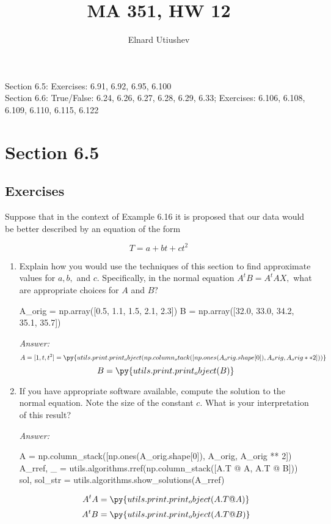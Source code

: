 \documentclass[letterpaper]{article}
\title{MA 351, HW 12}
\author{Elnard Utiushev}
\newcommand{\ans}{\textit{Answer: }}
\newenvironment{question}[2][Question]{\begin{trivlist}
\item[\hskip \labelsep {\bfseries #1}\hskip \labelsep {\bfseries #2.}]}{\end{trivlist}}
\newcommand{\printobj}[1]{\py{utils.print.print_object(#1)}}
\begin{document}
\maketitle

Section 6.5: Exercises: 6.91, 6.92, 6.95, 6.100 \\
Section 6.6: True/False: 6.24, 6.26, 6.27, 6.28, 6.29, 6.33; 
Exercises: 6.106, 6.108, 6.109, 6.110, 6.115, 6.122

\section{Section 6.5}
\subsection{Exercises}

\begin{question}{6.91}
  Suppose that in the context of Example 6.16 it is proposed that our data would
  be better described by an equation of the form

  $$
  T=a+b t+c t^{2}
  $$

  \begin{enumerate}
    \item Explain how you would use the techniques of this section to find
    approximate values for $a, b,$ and $c .$ Specifically, in the normal 
    equation $A^{t} B=A^{t} A X,$ what are appropriate choices for $A$ and $B ?$

    \begin{pycode}
A_orig = np.array([0.5, 1.1, 1.5, 2.1, 2.3])
B = np.array([32.0, 33.0, 34.2, 35.1, 35.7])
    \end{pycode}

    \ans 
    $$A = [1, t, t^2] = \printobj{np.column_stack([np.ones(A_orig.shape[0]), A_orig, A_orig ** 2])}$$
    $$B = \printobj{B}$$

    \item If you have appropriate software available, compute the solution to
    the normal equation. Note the size of the constant $c .$ What is your
    interpretation of this result?

    \ans

    \begin{pycode}
A = np.column_stack([np.ones(A_orig.shape[0]), A_orig, A_orig ** 2])
A_rref, _ = utils.algorithms.rref(np.column_stack([A.T @ A, A.T @ B]))
sol, sol_str = utils.algorithms.show_solutions(A_rref)
    \end{pycode}

    $$A^t A = \printobj{A.T @ A}$$
    $$A^t B = \printobj{A.T @ B}$$
  \end{enumerate}
\end{question}
\end{document}
